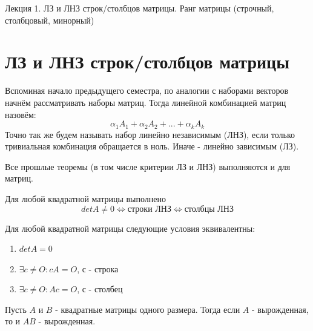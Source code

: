 \documentclass[11pt]{article}
\begin{document}
\begin{titlepage}
    \centering
    \vspace*{\fill}  %

    {\Huge Лекция 1. ЛЗ и ЛНЗ строк/столбцов матрицы. Ранг матрицы (строчный, столбцовый, минорный)
    \par}

    \vspace*{\fill}  %
\end{titlepage}

\setcounter{page}{1}

\section{ЛЗ и ЛНЗ строк/столбцов матрицы}

Вспоминая начало предыдущего семестра, по аналогии с наборами векторов начнём 
рассматривать наборы матриц. Тогда линейной комбинацией матриц назовём: 
\[\alpha_1A_1 + \alpha_2A_2 + ... + \alpha_kA_k\]
Точно так же будем называть набор линейно независимым (ЛНЗ), если только тривиальная 
комбинация обращается в ноль. Иначе - линейно зависимым (ЛЗ). 

\begin{remark}
    Все прошлые теоремы (в том числе критерии ЛЗ и ЛНЗ) выполняются и для матриц.
\end{remark}

\begin{theorem}
    Для любой квадратной матрицы выполнено 
    \[detA \neq 0 \Longleftrightarrow \text{строки ЛНЗ} \Longleftrightarrow \text{столбцы ЛНЗ}\]
\end{theorem}

\begin{theorem}
    Для любой квадратной матрицы следующие условия эквивалентны:
    \begin{enumerate}
        \item $detA = 0$
        \item $\exists c \neq O: cA = O$, с - строка
        \item $\exists c \neq O: Ac = O$, с - столбец
    \end{enumerate}
\end{theorem}

\begin{theorem}
    Пусть $A$ и $B$ - квадратные матрицы одного размера. Тогда если $A$ - вырожденная, 
    то и $AB$ - вырожденная.
\end{theorem}
\end{document}
